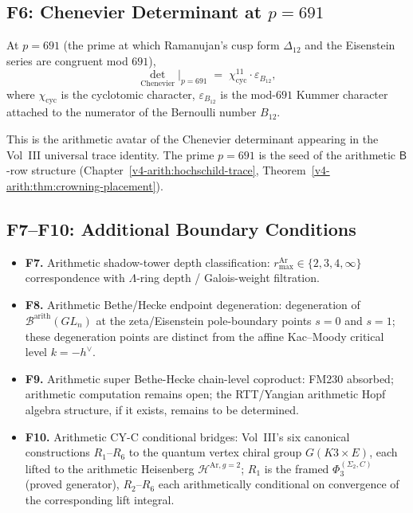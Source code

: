 \subsection{F6: Chenevier Determinant at \(p=691\)}
\label{v4-arith:of:F6-chenevier-691}

\begin{conjecture}
\label{v4-arith:conj:F6-chenevier-691}
At \(p=691\) (the prime at which Ramanujan's cusp form \(\Delta_{12}\)
and the Eisenstein series are congruent mod \(691\)),
\begin{equation}
\det_{\mathrm{Chenevier}}\bigl|_{p=691}\;=\;\chi_{\mathrm{cyc}}^{11}\cdot\varepsilon_{B_{12}},
\end{equation}
where \(\chi_{\mathrm{cyc}}\) is the cyclotomic character, \(\varepsilon_{B_{12}}\)
is the mod-\(691\) Kummer character attached to the numerator of the
Bernoulli number \(B_{12}\).
\end{conjecture}

\begin{remark}[connection]
This is the arithmetic avatar of the Chenevier determinant
appearing in the Vol~III universal trace identity. The prime
\(p=691\) is the seed of the arithmetic \(\mathsf{B}\)-row structure
(Chapter~\ref{v4-arith:hochschild-trace},
Theorem~\ref{v4-arith:thm:crowning-placement}).
\end{remark}

\subsection{F7--F10: Additional Boundary Conditions}
\label{v4-arith:of:F7-F10}

\begin{itemize}
\item \textbf{F7.} Arithmetic shadow-tower depth classification:
\(r_{\max}^{\mathrm{Ar}}\in\{2,3,4,\infty\}\) correspondence with
\(\Lambda\)-ring depth / Galois-weight filtration.
\item \textbf{F8.} Arithmetic Bethe/Hecke endpoint degeneration:
degeneration of \(\mathcal{B}^{\mathrm{arith}}(GL_{n})\) at the
zeta/Eisenstein pole-boundary points \(s=0\) and \(s=1\); these
degeneration points are distinct from the affine Kac--Moody
critical level \(k=-h^{\vee}\).
\item \textbf{F9.} Arithmetic super Bethe-Hecke chain-level coproduct:
FM230 absorbed; arithmetic computation remains open; the
RTT/Yangian arithmetic Hopf algebra structure, if it exists, remains
to be determined.
\item \textbf{F10.} Arithmetic CY-C conditional bridges: Vol~III's
six canonical constructions \(R_1\)--\(R_6\)
to the quantum vertex chiral group \(G(K3\times E)\), each lifted
to the arithmetic Heisenberg \(\mathcal{H}^{\mathrm{Ar},g=2}\);
\(R_1\) is the framed \(\Phi_3^{(\Sigma_2,C)}\) (proved generator),
\(R_2\)--\(R_6\) each arithmetically conditional on convergence of
the corresponding lift integral.
\end{itemize}

